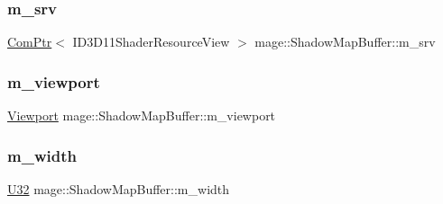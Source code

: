 \hypertarget{structmage_1_1_shadow_map_buffer_af313b37ddc41f91e949d015086f6ba18}{}\label{structmage_1_1_shadow_map_buffer_af313b37ddc41f91e949d015086f6ba18} 
\subsubsection{\texorpdfstring{m\+\_\+srv}{m\_srv}}
{\footnotesize\ttfamily \hyperlink{namespacemage_ae74f374780900893caa5555d1031fd79}{Com\+Ptr}$<$ I\+D3\+D11\+Shader\+Resource\+View $>$ mage\+::\+Shadow\+Map\+Buffer\+::m\+\_\+srv\hspace{0.3cm}{\ttfamily [private]}}

\hypertarget{structmage_1_1_shadow_map_buffer_a5dd4126af774f674f69280f53dd8393d}{}\label{structmage_1_1_shadow_map_buffer_a5dd4126af774f674f69280f53dd8393d} 
\subsubsection{\texorpdfstring{m\+\_\+viewport}{m\_viewport}}
{\footnotesize\ttfamily \hyperlink{structmage_1_1_viewport}{Viewport} mage\+::\+Shadow\+Map\+Buffer\+::m\+\_\+viewport\hspace{0.3cm}{\ttfamily [private]}}

\hypertarget{structmage_1_1_shadow_map_buffer_ac8c9e5e52c31c9d358e4bb0f306439a6}{}\label{structmage_1_1_shadow_map_buffer_ac8c9e5e52c31c9d358e4bb0f306439a6} 
\subsubsection{\texorpdfstring{m\+\_\+width}{m\_width}}
{\footnotesize\ttfamily \hyperlink{namespacemage_a41c104c036fba3756a74e19f793eeaa1}{U32} mage\+::\+Shadow\+Map\+Buffer\+::m\+\_\+width\hspace{0.3cm}{\ttfamily [private]}}

